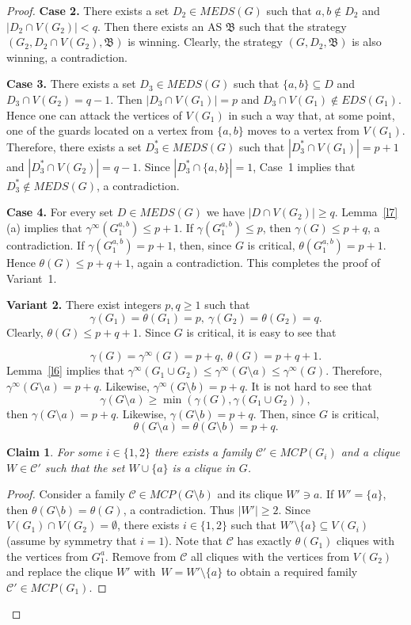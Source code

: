 \documentclass[12pt]{article}
\newtheorem{claim}{Claim}
\begin{document}
\begin{proof}
\textbf{Case 2.} There exists a set $D_2 \in MEDS(G)$ such that $a,b \notin D_2$ and $|D_2 \cap V(G_2)| < q$. Then there exists an AS $\mathfrak{B}$ such that the strategy $(G_2,D_2 \cap V(G_2),\mathfrak{B})$ is winning. Clearly, the strategy $(G,D_2,\mathfrak{B})$ is also winning, a contradiction.

\textbf{Case 3.} There exists a set $D_3 \in MEDS(G)$ such that $\{a,b\} \subseteq D$ and $D_3 \cap V(G_2) = q - 1$. Then $|D_3 \cap V(G_1)| = p$ and $D_3 \cap V(G_1) \notin EDS(G_1)$. Hence one can attack the vertices of $V(G_1)$ in such a way that, at some point, one of the guards located on a vertex from $\{a,b\}$ moves to a vertex from $V(G_1)$. Therefore, there exists a set $D^*_3 \in MEDS(G)$ such that $|D^*_3 \cap V(G_1)| = p + 1$ and $|D^*_3 \cap V(G_2)| = q - 1$. Since $|D^*_3 \cap \{a,b\}| = 1$, Case~1 implies that $D^*_3 \notin MEDS(G)$, a contradiction.

\textbf{Case 4.} For every set $D \in MEDS(G)$ we have $|D \cap V(G_2)| \geq q$. Lemma~\ref{l7}(a) implies that $\gamma^{\infty}(G_1^{a,b}) \leq p + 1$. If $\gamma(G_1^{a,b}) \leq p$, then $\gamma(G) \leq p + q$, a contradiction. If $\gamma(G_1^{a,b}) = p + 1$, then, since $G$ is critical, $\theta(G_1^{a,b}) = p + 1$. Hence  $\theta(G) \leq p + q + 1$, again a contradiction. This completes the proof of Variant~1.

\textbf{Variant 2.} There exist integers $p,q \geq 1$ such that $$\gamma(G_1) = \theta(G_1) = p, \ \gamma(G_2) = \theta(G_2) = q.$$ Clearly, $\theta(G) \leq p + q + 1$. Since $G$ is critical, it  is easy to see that

$$\gamma(G) = \gamma^{\infty}(G) = p + q, \ \theta(G) = p + q + 1.$$
Lemma~\ref{l6} implies that $\gamma^{\infty}(G_1 \cup G_2) \leq \gamma^{\infty}(G \setminus a) \leq \gamma^{\infty}(G)$. Therefore, $\gamma^{\infty}(G \setminus a) = p + q$. Likewise, $\gamma^{\infty}(G \setminus b) = p + q$. It is not hard to see that $$\gamma(G \setminus a) \geq \min(\gamma(G),\gamma(G_1 \cup G_2)),$$ then $\gamma(G \setminus a) = p + q$. Likewise, $\gamma(G \setminus b) = p + q$. Then, since $G$ is critical, $$ \theta(G \setminus a) = \theta(G \setminus b) = p + q.$$

\begin{claim}\label{cl1}
For some $i \in \{1,2\}$ there exists a family $\mathcal{C}' \in MCP(G_i)$ and a clique $W \in \mathcal{C}'$ such that the set $W \cup \{a\}$ is a clique in $G$.
\end{claim}


\begin{proof}
Consider a family $\mathcal{C} \in MCP(G \setminus b)$ and its clique $W' \ni a$. If $W' = \{a\}$, then $\theta(G \setminus b) = \theta(G)$, a contradiction. Thus $|W'| \geq 2$. Since $V(G_1) \cap V(G_2) = \emptyset$, there exists $i \in \{1,2\}$ such that $W' \setminus \{a\} \subseteq V(G_i)$ (assume by symmetry that $i = 1$). Note that $\mathcal{C}$ has exactly $\theta(G_1)$ cliques with the vertices from $G^a_1$. Remove from $\mathcal{C}$ all cliques with the vertices from $V(G_2)$  and replace the clique $W'$ with~$W = W' \setminus \{a\}$ to obtain a required family $\mathcal{C}' \in MCP(G_1)$. 
\end{proof}


\end{proof}
\end{document}

